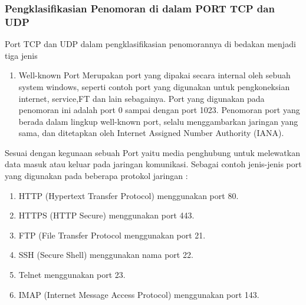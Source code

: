 \documentclass[12pt,a4paper]{article}
\begin{document}
\subsubsection{Pengklasifikasian Penomoran di dalam PORT TCP dan UDP}

\hspace{1cm}
Port TCP dan UDP dalam pengklasifikasian penomorannya di bedakan menjadi tiga jenis
\begin{enumerate}
\item Well-known Port Merupakan port yang dipakai secara internal oleh sebuah system windows, seperti contoh port yang digunakan untuk pengkoneksian internet, service,FT dan lain sebagainya. Port yang digunakan pada penomoran ini adalah port 0 sampai dengan port 1023. Penomoran port yang berada dalam lingkup well-known port, selalu menggambarkan jaringan yang sama, dan ditetapkan oleh Internet Assigned Number Authority (IANA).

\end{enumerate}
\hspace{1cm}
Sesuai dengan kegunaan sebuah Port yaitu media penghubung untuk melewatkan data masuk atau keluar pada jaringan komunikasi. Sebagai contoh jenis-jenis port yang digunakan pada beberapa protokol jaringan :\\
\begin{enumerate}
\item HTTP (Hypertext Transfer Protocol) menggunakan port 80.
\item HTTPS (HTTP Secure) menggunakan port 443.
\item FTP (File Transfer Protocol menggunakan port 21.
\item SSH (Secure Shell) menggunakan nama port 22.
\item Telnet menggunakan port 23.
\item IMAP (Internet Message Access Protocol) menggunakan port 143.
\end{enumerate}
\end{document}
